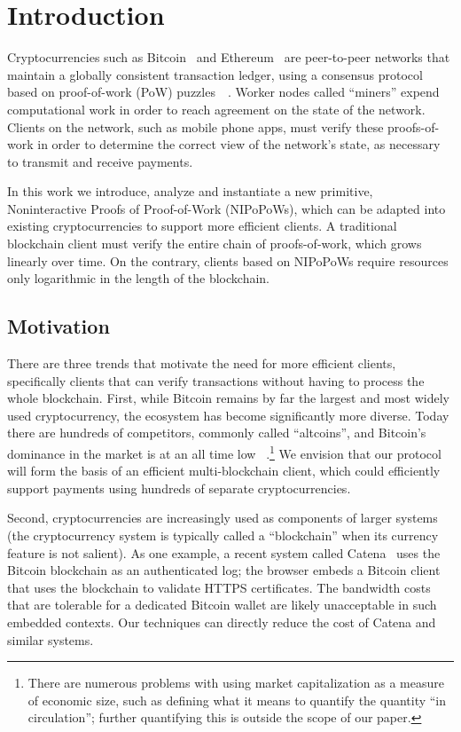 \section{Introduction}

Cryptocurrencies such as Bitcoin~\cite{bitcoin}\cite{bitcoinsoftware} and
Ethereum~\cite{ethereum} are
peer-to-peer networks that maintain a globally consistent transaction ledger,
using a consensus protocol based on proof-of-work (PoW)
puzzles~\cite{pow}~\cite{hashcash}. Worker nodes called ``miners'' expend
computational work in order to reach agreement on the state of the network.
Clients on the network, such as mobile phone apps, must verify these
proofs-of-work in order to determine the correct view of the network's state, as
necessary to transmit and receive payments.

In this work we introduce, analyze and instantiate a new primitive,
Noninteractive Proofs of Proof-of-Work (NIPoPoWs), which can be adapted into
existing cryptocurrencies to support more efficient clients. A traditional
blockchain client must verify the entire chain of proofs-of-work, which grows
linearly over time. On the contrary, clients based on NIPoPoWs require resources
only logarithmic in the length of the blockchain.

\subsection{Motivation}

There are three trends that motivate the need for more efficient clients,
specifically clients that can verify transactions without having to process the
whole blockchain. First, while Bitcoin remains by far the largest and most
widely used cryptocurrency, the ecosystem has become significantly more diverse.
Today there are hundreds of competitors, commonly called ``altcoins'', and
Bitcoin's dominance in the market is at an all time low
~\cite{marketcap}.\footnote{There are numerous problems with using  market
capitalization as a measure of economic size, such as defining what it means to
quantify the quantity ``in circulation''; further quantifying this is outside
the scope of our paper.} We envision that our protocol will form the basis of an
efficient multi-blockchain client, which could efficiently support payments
using hundreds of separate cryptocurrencies.

Second, cryptocurrencies are increasingly used as components of larger systems
(the cryptocurrency system is typically called a ``blockchain'' when its
currency feature is not salient). As one example, a recent system called
Catena~\cite{catena} uses the Bitcoin blockchain as an authenticated log; the
browser embeds a Bitcoin client that uses the blockchain to validate HTTPS
certificates. The bandwidth costs that are tolerable for a dedicated Bitcoin
wallet are likely unacceptable in such embedded contexts. Our techniques can
directly reduce the cost of Catena and similar systems.

